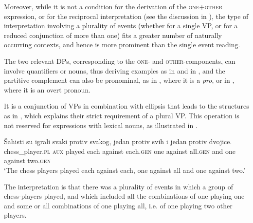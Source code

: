 \documentclass[output=paper,colorlinks,citecolor=brown]{langscibook}
\begin{document}
Moreover, while it is not a condition for the derivation of the \textsc{one$+$other} expression, or for the reciprocal interpretation (see the discussion in ), the type of interpretation involving a plurality of events (whether for a single VP, or for a reduced conjunction of more than one) fits a greater number of naturally occurring contexts, and hence is more prominent than the single event reading.

The two relevant DPs, corresponding to the \textsc{one}- and \textsc{other}-components, can involve quantifiers or nouns, thus deriving examples as in  and in , and the partitive complement can also be pronominal, as in , where it is a \textit{pro}, or in , where it is an overt pronoun.

\ea\label{Oni}
 \label{ex:arsenijevic:Oni-a}

  \label{ex:arsenijevic:Oni-b}
\z \z

\noindent It is a conjunction of VPs in combination with ellipsis that leads to the structures as in , which explains their strict requirement of a plural VP. This operation is not reserved for expressions with lexical nouns, as illustrated in .

\ea\label{Šahisti3} \gll Šahisti su igrali svaki protiv svakog, jedan protiv svih i jedan protiv dvojice.\\
 chess\_player.\textsc{pl} \textsc{aux} played each against each.\textsc{gen} one against all.\textsc{gen} and one against two.\textsc{gen}\\
\glt `The chess players played each against each, one against all and one against two.'
 \z

\noindent The interpretation is that there was a plurality of events in which a group of chess-players played, and which included all the combinations of one playing one and some or all combinations of one playing all, i.e. of one playing two other players.
\end{document}
